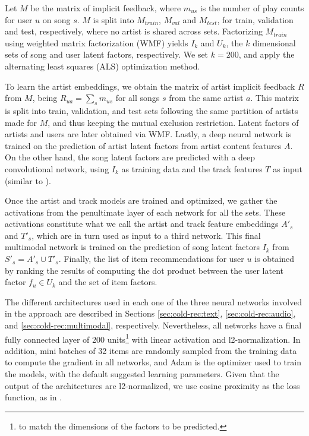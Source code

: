 Let $M$ be the matrix of implicit feedback, where $m_{us}$ is the number of play counts for user $u$ on song $s$. 
$M$ is split into $M_{train}$, $M_{val}$ and $M_{test}$, for train, validation and test, respectively, where no artist is shared across sets. 
Factorizing $M_{train}$ using weighted matrix factorization (WMF) \citep{Hu2008} yields $I_{k}$ and $U_{k}$, the $k$ dimensional sets of song and user latent factors, respectively.
We set $k=200$, and apply the alternating least squares (ALS) optimization method.%


To learn the artist embeddings, we obtain the matrix of artist implicit feedback $R$ from $M$, being $R_{ua} = \sum_{s}m_{us}$ for all songs $s$ from the same artist $a$. This matrix is split into train, validation, and test sets following the same partition of artists made for $M$, and thus keeping the mutual exclusion restriction. 
Latent factors of artists and users are later obtained via WMF. 
Lastly, a deep neural network is trained on the prediction of artist latent factors from artist content features $A$.
On the other hand, the song latent factors are predicted with a deep convolutional network, using $I_{k}$ as training data and the track features $T$ as input (similar to \cite{Oord2013}).

Once the artist and track models are trained and optimized, we gather the activations from the penultimate layer of each network for all the sets. These activations constitute what we call the artist and track feature embeddings $A'_{s}$ and $T'_{s}$, which are in turn used as input to a third network. 
This final multimodal network is trained on the prediction of song latent factors $I_{k}$ from $S'_{s} = A'_{s} \cup T'_{s}$.
Finally, the list of item recommendations for user $u$ is obtained by ranking the results of computing the dot product between the user latent factor $f_{u} \in U_{k}$ and the set of item factors. %


The different architectures used in each one of the three neural networks involved in the approach are described in Sections \ref{sec:cold-rec:text}, \ref{sec:cold-rec:audio}, and \ref{sec:cold-rec:multimodal}, respectively.
Nevertheless, all networks have a final fully connected layer of 200 units\footnote{to match the dimensions of the factors to be predicted.} with linear activation and l2-normalization. 
In addition, mini batches of 32 items are randomly sampled from the training data to compute the gradient in all networks, and Adam \citep{KingmaB14} is the optimizer used to train the models, with the default suggested learning parameters. 
Given that the output of the architectures are l2-normalized, we use cosine proximity as the loss function, as in \cite{Chollet2016}.

